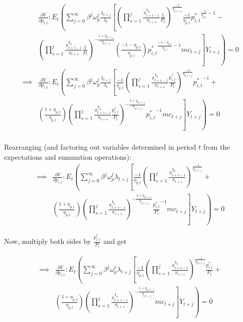 \documentclass[article,11pt,letterpaper,fleqn]{article}
\theoremstyle{definition}
\numberwithin{equation}{section}
\begin{document}
\begin{equation}
\begin{split}
 & \frac{\partial V}{\partial p_{i,t}}: E_{t}\left(\sum_{j=0}^{\infty} \beta^{j}\omega^{j}_{p}\frac{\lambda_{t+j}}{\lambda_{t}}\left[\left(\prod_{s=1}^{j}\frac{\pi^{\chi_{p}}_{t+s-1}}{\pi_{t+s}}\frac{1}{P_{t}}\right)^{\frac{-1}{\eta_{p,t+j}}}\frac{-1}{\eta_{p,t}}{p^{*}_{i,t}}^{\frac{-1}{\eta_{p,t}}-1}- \right. \right. \\
 & \left. \left. \left(\prod_{s=1}^{j}\frac{\pi^{\chi_{p}}_{t+s-1}}{\pi_{t+s}}\frac{1}{P_{t}}\right)^{-\frac{1+\eta_{p,t+j}}{\eta_{p,t+j}}}\left(\frac{-1-\eta_{p,t}}{\eta_{p,t}}\right){p^{*}_{i,t}}^{\frac{-1-\eta_{p,t}}{\eta_{p,t}}-1}mc_{t+j}\right]Y_{t+j}\right) = 0 \\
\implies & \frac{\partial V}{\partial p_{i,t}}: E_{t}\left(\sum_{j=0}^{\infty} \beta^{j}\omega^{j}_{p}\frac{\lambda_{t+j}}{\lambda_{t}}\left[\frac{-1}{\eta_{p,t}}\left(\prod_{s=1}^{j}\frac{\pi^{\chi_{p}}_{t+s-1}}{\pi_{t+s}}\frac{p^{*}_{i,t}}{P_{t}}\right)^{\frac{-1}{\eta_{p,t+j}}}{p^{*}_{i,t}}^{-1} +  \right. \right. \\
 & \left. \left. \left(\frac{1+\eta_{p,t}}{\eta_{p,t}}\right)\left(\prod_{s=1}^{j}\frac{\pi^{\chi_{p}}_{t+s-1}}{\pi_{t+s}}\frac{p^{*}_{i,t}}{P_{t}}\right)^{-\frac{1+\eta_{p,t+j}}{\eta_{p,t+j}}}{p^{*}_{i,t}}^{-1}mc_{t+j}\right]Y_{t+j}\right) = 0 \\
\end{split}
\end{equation}

Rearranging (and factoring out variables determined in period $t$ from the expectations and summation operations):
\begin{equation}
\begin{split}
\implies & \frac{\partial V}{\partial p_{i,t}}: E_{t}\left(\sum_{j=0}^{\infty} \beta^{j}\omega^{j}_{p}\lambda_{t+j}\left[\frac{-1}{\eta_{p,t}}\left(\prod_{s=1}^{j}\frac{\pi^{\chi_{p}}_{t+s-1}}{\pi_{t+s}}\right)^{\frac{-1}{\eta_{p,t+j}}} +  \right. \right. \\
 & \left. \left. \left(\frac{1+\eta_{p,t}}{\eta_{p,t}}\right)\left(\prod_{s=1}^{j}\frac{\pi^{\chi_{p}}_{t+s-1}}{\pi_{t+s}}\right)^{-\frac{1+\eta_{p,t+j}}{\eta_{p,t+j}}}\frac{p^{*}_{i,t}}{P_{t}}^{-1}mc_{t+j}\right]Y_{t+j}\right) = 0  
\end{split}
\end{equation}

Now, multiply both sides by $\frac{p^{*}_{i,t}}{P_{t}}$ and get

\begin{equation}
\begin{split}
\implies & \frac{\partial V}{\partial p_{i,t}}: E_{t}\left(\sum_{j=0}^{\infty} \beta^{j}\omega^{j}_{p}\lambda_{t+j}\left[\frac{-1}{\eta_{p,t}}\left(\prod_{s=1}^{j}\frac{\pi^{\chi_{p}}_{t+s-1}}{\pi_{t+s}}\right)^{\frac{-1}{\eta_{p,t+j}}}\frac{p^{*}_{i,t}}{P_{t}} +  \right. \right. \\
 & \left. \left. \left(\frac{1+\eta_{p,t}}{\eta_{p,t}}\right)\left(\prod_{s=1}^{j}\frac{\pi^{\chi_{p}}_{t+s-1}}{\pi_{t+s}}\right)^{-\frac{1+\eta_{p,t+j}}{\eta_{p,t+j}}}mc_{t+j}\right]Y_{t+j}\right) = 0  
\end{split}
\end{equation}
\end{document}
